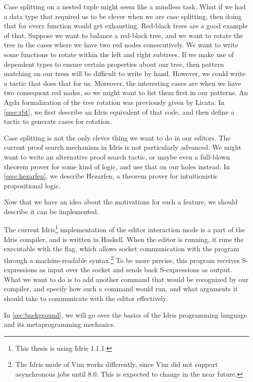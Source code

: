 Case splitting on a nested tuple might seem like a mindless task. What if we
had a data type that required us to be clever when we are case splitting,
then doing that for every function would get exhausting.
Red-black trees\cite{okasakiRedBlack} are a good example of that.
Suppose we want to balance a red-black tree, and we want to rotate the tree in
the cases where we have two red nodes consecutively. We want to write some
functions to rotate within the left and right subtrees. If we make use of
dependent types to ensure certain properties about our tree, then pattern
matching on our trees will be difficult to write by hand. However, we could
write a tactic that does that for us. Moreover, the interesting cases are when
we have two consequent red nodes, so we might want to list them first in our
patterns.  An Agda formalization of the tree rotation was previously given by
Licata\cite{licataOPLSS}. In \autoref{ssec:rbt}, we first describe an Idris
equivalent of that code, and then define a tactic to generate cases for
rotation.

Case splitting is not the only clever thing we want to do in our editors.
The current proof search mechanism in Idris is not particularly advanced.
We might want to write an alternative proof search tactic, or maybe even a
full-blown theorem prover for some kind of logic, and use that on our holes
instead. In \autoref{ssec:hezarfen}, we describe Hezarfen, a theorem prover for
intuitionistic propositional logic.

Now that we have an idea about the motivations for such a feature, we should
describe it can be implemented.


The current Idris\footnote{This thesis is using Idris 1.1.1.} implementation of
the editor interaction mode is a part of the Idris compiler, and is written in Haskell. When the editor is running,
it runs the  executable with the  flag, which
allows socket communication with the program through a machine-readable
syntax.\footnote{The Idris mode of Vim works differently, since Vim did not
support asynchronous jobs until 8.0. This is expected to change in the near
future.}
To be more precise, this program receives S-expressions\cite{mccarthy} as input
over the socket and sends back S-expressions as output.
What we want to do is to add another command that would be recognized by our
compiler, and specify how such a command would run, and what arguments it should
take to communicate with the editor effectively.

In \autoref{sec:background}, we will go over the basics of the Idris
programming language and its metaprogramming mechanics.
